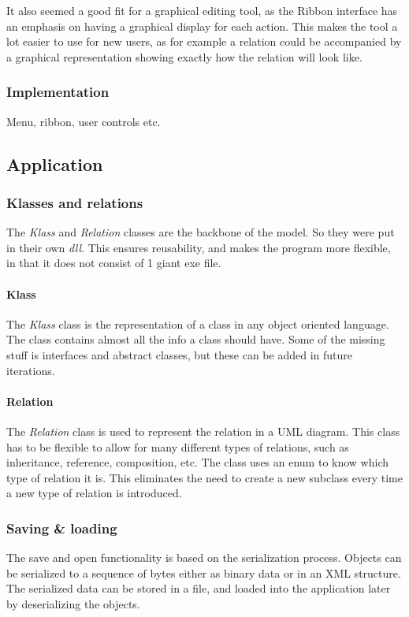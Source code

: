 It also seemed a good fit for a graphical editing tool, as the Ribbon interface
has an emphasis on having a graphical display for each action. This makes the
tool a lot easier to use for new users, as for example a relation could be
accompanied by a graphical representation showing exactly how the relation will
look like.  \subsubsection{Implementation} Menu, ribbon, user controls etc.


\subsection{Application} 

\subsubsection{Klasses and relations}
The \textit{Klass} and \textit{Relation} classes are the backbone of the model.
So they were put in their own \textit{dll}. This ensures reusability, and makes
the program more flexible, in that it does not consist of 1 giant exe file.

\paragraph{Klass}
The \textit{Klass} class is the representation of a class in any object oriented
language. The class contains almost all the info a class should have. Some of
the missing stuff is interfaces and abstract classes, but these can be added in
future iterations.

\paragraph{Relation}
The \textit{Relation} class is used to represent the relation in a UML diagram.
This class has to be flexible to allow for many different types of relations,
such as inheritance, reference, composition, etc. The class uses an enum to know
which type of relation it is. This eliminates the need to create a new subclass
every time a new type of relation is introduced.

\subsubsection{Saving \& loading}
The save and open functionality is based on the serialization process. Objects
can be serialized to a sequence of bytes either as binary data or in an XML
structure. The serialized data can be stored in a file, and loaded into the
application later by deserializing the objects.

